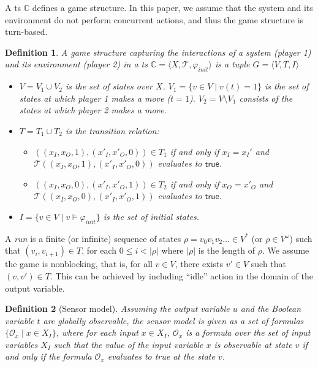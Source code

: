 \documentclass[letterpaper, 10 pt, conference]{ieeeconf}
\newtheorem{definition}{Definition}
\newcommand{\truev}{\mathsf{true}}
\providecommand{\abs}[1]{\lvert#1\rvert}
\begin{document}
A  \ac{ts} $\mathbb{C}$ defines a game structure. In
this paper, we
assume that the system and its environment do not perform concurrent
actions, and thus the game structure is turn-based.
  \begin{definition} A \emph{game structure} capturing the
    interactions of a system (player 1) and its environment (player 2)
    in a \ac{ts} $\mathbb{C} = \langle
X, \mathcal{T}, \varphi_{init}\rangle$ is a tuple $G= \langle V, T, I\rangle$
    \begin{itemize}
\item $V=V_1\cup V_2$ is the set of states over $X$. $V_1  =\{v\in V\mid v(t)=1\} $ is the set of states at which player 1 makes a
  move ($t=1$). $ V_2= V\setminus V_1 $ consists of the states at
  which player 2 makes a move.
 \item $T =T_1\cup T_2$ is the transition relation: 
\begin{itemize}
 \item $((x_I,x_O,1), (x'_I,x'_O, 0) ) \in T_1$ if and only if $x_I=x_I'$
  and $\mathcal{T}((x_I,x_O,1), (x'_I,x'_O, 0) )$ evaluates to $\truev$.
\item $((x_I,x_O,0), (x'_I,x'_O, 1) ) \in T_2$ if and only if $x_O= x'_O$ and
  $\mathcal{T} ((x_I,x_O,0), (x'_I,x'_O, 1) )  $ evaluates to $\truev$.
\end{itemize}
 \item $I =\{v\in V \mid v \models \varphi_{init}\}$ is the set of
   initial states.
\end{itemize} 
\end{definition}
A \emph{run} is a finite (or infinite) sequence of states $\rho
=v_0 v_1 v_2\ldots \in V^\ast$ (or $\rho \in V^\omega$) such
that $(v_i,v_{i+1}) \in T$, for each $ 0 \le i < \abs{\rho}$
where $\abs{\rho}$ is the length of $\rho$. We assume the game is
nonblocking, that is, for all $v\in V$, there exists $v'\in V$ such
that $(v,v')\in T$. This can be achieved by including 
``idle'' action in the domain of the output variable.



\begin{definition}[Sensor model]
  Assuming the output variable $u$ and the Boolean variable $t$ are
  globally observable, the sensor model is given as a set of formulas
  $\{\mathcal{O}_x\mid x\in X_I\}$, where for each input $x\in X_I$,
  $\mathcal{O}_x$ is a formula over the set of input variables $X_I $
  such that the value of the input variable $x$ is observable at state
  $v$ if and only if the formula $\mathcal{O}_x $ evaluates to true at
  the state $v$.
\end{definition}
\end{document}

